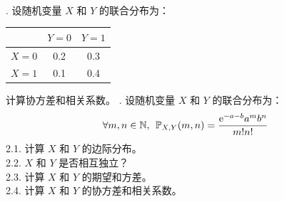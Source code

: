 \documentclass[12pt,UTF8]{ctexbook}
\begin{document}
\begin{xt}
    \mbox{} \\
    . 设随机变量 \(X\) 和 \(Y\) 的联合分布为：
    \begin{center}
        \begin{tabular}{c|cc}
            & \(Y=0\) & \(Y=1\) \\ \hline
            \(X=0\) & 0.2 & 0.3 \\
            \(X=1\) & 0.1 & 0.4
        \end{tabular}
    \end{center}
    计算协方差和相关系数。
    . 设随机变量 \(X\) 和 \(Y\) 的联合分布为：
    $$ \forall m, n\in \mathbb{N},\;\, \mathbb{P}_{X,Y}(m, n) = \frac{\mathrm{e}^{-a-b}a^mb^n}{m!n!} $$ 
    2.1. 计算 \(X\) 和 \(Y\) 的边际分布。\\
    2.2. \(X\) 和 \(Y\) 是否相互独立？\\
    2.3. 计算 \(X\) 和 \(Y\) 的期望和方差。\\
    2.4. 计算 \(X\) 和 \(Y\) 的协方差和相关系数。
\end{xt}












\end{document}

